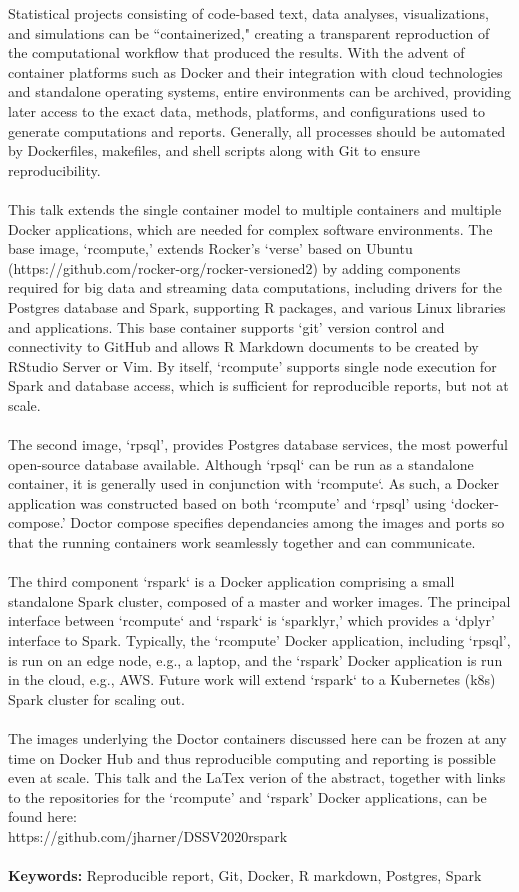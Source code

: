 Statistical projects consisting of code-based text, data analyses, visualizations, and simulations can be ``containerized," creating a transparent reproduction of the computational workflow that produced the results. With the advent of container platforms such as Docker and their integration with cloud technologies and standalone operating systems, entire environments can be archived, providing later access to the exact data, methods, platforms, and configurations used to generate computations and reports. Generally, all processes should be automated by Dockerfiles, makefiles, and shell scripts along with Git to ensure reproducibility.\\
\\
This talk extends the single container model to multiple containers and multiple Docker applications, which are needed for complex software environments. The base image, `rcompute,' extends Rocker's `verse' based on Ubuntu (https://github.com/rocker-org/rocker-versioned2) by adding components required for big data and streaming data computations, including drivers for the Postgres database and Spark, supporting R packages, and various Linux libraries and applications. This base container supports `git' version control and connectivity to GitHub and allows R Markdown documents to be created by RStudio Server or Vim. By itself, `rcompute' supports single node execution for Spark and database access, which is sufficient for reproducible reports, but not at scale.\\
\\
The second image, `rpsql', provides Postgres database services, the most powerful open-source database available. Although `rpsql` can be run as a standalone container, it is generally used in conjunction with `rcompute`. As such, a Docker application was constructed based on both `rcompute' and `rpsql' using `docker-compose.' Doctor compose specifies dependancies among the images and ports so that the running containers work seamlessly together and can communicate.\\
\\
The third component `rspark` is a Docker application comprising a small standalone Spark cluster, composed of a master and worker images. The principal interface between `rcompute` and `rspark` is `sparklyr,' which provides a `dplyr' interface to Spark. Typically, the `rcompute' Docker application, including `rpsql', is run on an edge node, e.g., a laptop, and the `rspark' Docker application is run in the cloud, e.g., AWS. Future work will extend `rspark` to a Kubernetes (k8s) Spark cluster for scaling out.\\
\\
The images underlying the Doctor containers discussed here can be frozen at any time on Docker Hub and thus reproducible computing and reporting is possible even at scale. This talk and the LaTex verion of the abstract, together with links to the repositories for the `rcompute' and `rspark' Docker applications, can be found here:\\ https://github.com/jharner/DSSV2020rspark\\
\\
\textbf{Keywords:} Reproducible report, Git, Docker, R markdown, Postgres, Spark


